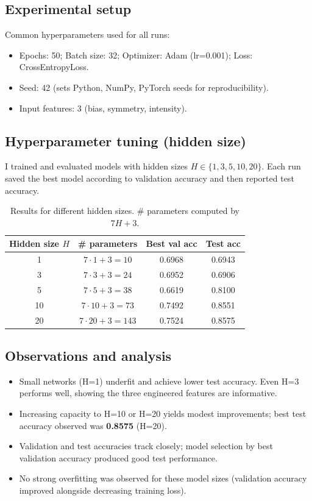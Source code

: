 \documentclass[12pt]{article}
\begin{document}
\subsection*{Experimental setup}
Common hyperparameters used for all runs:
\begin{itemize}
  \item Epochs: 50; Batch size: 32; Optimizer: Adam (lr=0.001); Loss: CrossEntropyLoss.
  \item Seed: 42 (sets Python, NumPy, PyTorch seeds for reproducibility).
  \item Input features: 3 (bias, symmetry, intensity).
\end{itemize}

\subsection*{Hyperparameter tuning (hidden size)}
I trained and evaluated models with hidden sizes $H\in\{1,3,5,10,20\}$. Each run saved the best model according to validation accuracy and then reported test accuracy.

\begin{table}[h!]
\centering
\begin{tabular}{@{}cccc@{}}
\toprule
Hidden size $H$ & \# parameters & Best val acc & Test acc \\
\midrule
1  & $7\cdot1+3=10$  & 0.6968 & 0.6943 \\
3  & $7\cdot3+3=24$  & 0.6952 & 0.6906 \\
5  & $7\cdot5+3=38$  & 0.6619 & 0.8100 \\
10 & $7\cdot10+3=73$ & 0.7492 & 0.8551 \\
20 & $7\cdot20+3=143$& 0.7524 & 0.8575 \\
\bottomrule
\end{tabular}
\caption{Results for different hidden sizes. \# parameters computed by $7H+3$.}
\end{table}

\subsection*{Observations and analysis}
\begin{itemize}
  \item Small networks (H=1) underfit and achieve lower test accuracy. Even H=3 performs well, showing the three engineered features are informative.
  \item Increasing capacity to H=10 or H=20 yields modest improvements; best test accuracy observed was \textbf{0.8575} (H=20).
  \item Validation and test accuracies track closely; model selection by best validation accuracy produced good test performance.
  \item No strong overfitting was observed for these model sizes (validation accuracy improved alongside decreasing training loss).
\end{itemize}
\end{document}
